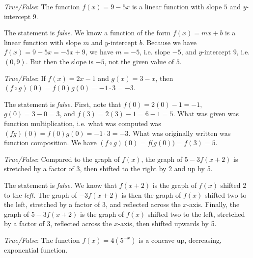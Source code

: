 \documentclass[11pt,letterpaper]{article}
\begin{document}
\thispagestyle{title}

\quizsol \textit{True/False}: The function $f(x)= 9 - 5x$ is a linear function with slope $5$ and $y$-intercept $9$. \pspace

\sol The statement is \textit{false}. We know a function of the form $f(x)= mx + b$ is a linear function with slope $m$ and $y$-intercept $b$. Because we have $f(x)= 9 - 5x= -5x + 9$, we have $m= -5$, i.e. slope $-5$, and $y$-intercept $9$, i.e. $(0, 9)$. But then the slope is $-5$, not the given value of $5$. \pvspace{1.3cm}



\quizsol \textit{True/False}: If $f(x)= 2x - 1$ and $g(x)= 3 - x$, then $(f \circ g)(0)= f(0)g(0)= -1 \cdot 3= -3$. \pspace

\sol The statement is \textit{false}. First, note that $f(0)= 2(0) - 1= -1$, $g(0)= 3 - 0= 3$, and $f(3)= 2(3) - 1= 6 - 1= 5$. What was given was function multiplication, i.e. what was computed was $(fg)(0)= f(0) g(0)= -1 \cdot 3= -3$. What was originally written was function composition. We have $(f \circ g)(0)= f\big(g(0) \big)= f(3)= 5$. \pvspace{1.3cm}



\quizsol \textit{True/False}: Compared to the graph of $f(x)$, the graph of $5 - 3f(x + 2)$ is stretched by a factor of 3, then shifted to the right by 2 and up by 5. \pspace

\sol The statement is \textit{false}. We know that $f(x + 2)$ is the graph of $f(x)$ shifted 2 to the \textit{left}. The graph of $-3f(x + 2)$ is then the graph of $f(x)$ shifted two to the left, stretched by a factor of 3, and reflected across the $x$-axis. Finally, the graph of $5 - 3f(x + 2)$ is the graph of $f(x)$ shifted two to the left, stretched by a factor of 3, reflected across the $x$-axis, then shifted upwards by 5. \pvspace{1.3cm}



\quizsol \textit{True/False}: The function $f(x)= 4(5^{-x})$ is a concave up, decreasing, exponential function. \pspace
\end{document}
